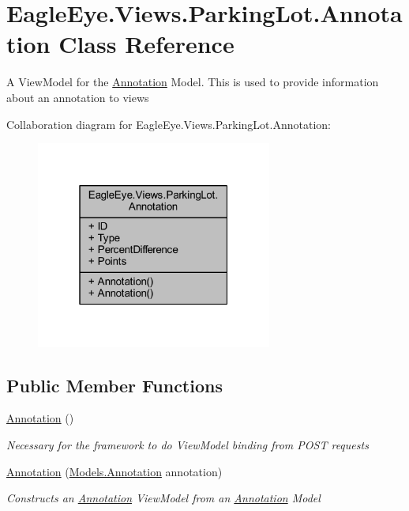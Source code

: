\hypertarget{class_eagle_eye_1_1_views_1_1_parking_lot_1_1_annotation}{}\section{Eagle\+Eye.\+Views.\+Parking\+Lot.\+Annotation Class Reference}
\label{class_eagle_eye_1_1_views_1_1_parking_lot_1_1_annotation}


A View\+Model for the \mbox{\hyperlink{class_eagle_eye_1_1_views_1_1_parking_lot_1_1_annotation}{Annotation}} Model. This is used to provide information about an annotation to views  




Collaboration diagram for Eagle\+Eye.\+Views.\+Parking\+Lot.\+Annotation\+:\nopagebreak
\begin{figure}[H]
\begin{center}
\leavevmode
\includegraphics[width=220pt]{class_eagle_eye_1_1_views_1_1_parking_lot_1_1_annotation__coll__graph}
\end{center}
\end{figure}
\subsection*{Public Member Functions}
\begin{DoxyCompactItemize}
\item 
\mbox{\hyperlink{class_eagle_eye_1_1_views_1_1_parking_lot_1_1_annotation_a219a85017ab1fb54045c686bd49e2e32}{Annotation}} ()
\begin{DoxyCompactList}\small\item\em Necessary for the framework to do View\+Model binding from P\+O\+ST requests \end{DoxyCompactList}\item 
\mbox{\hyperlink{class_eagle_eye_1_1_views_1_1_parking_lot_1_1_annotation_a49916dc64f4e7e0a7ab9883c68abf103}{Annotation}} (\mbox{\hyperlink{class_eagle_eye_1_1_models_1_1_annotation}{Models.\+Annotation}} annotation)
\begin{DoxyCompactList}\small\item\em Constructs an \mbox{\hyperlink{class_eagle_eye_1_1_views_1_1_parking_lot_1_1_annotation}{Annotation}} View\+Model from an \mbox{\hyperlink{class_eagle_eye_1_1_views_1_1_parking_lot_1_1_annotation}{Annotation}} Model \end{DoxyCompactList}\end{DoxyCompactItemize}
